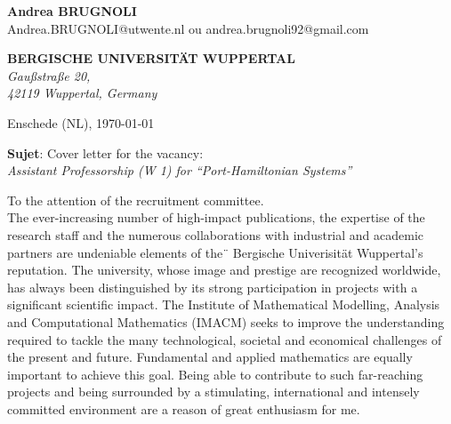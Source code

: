 \documentclass[11pt]{letter}
\begin{document}
	\sffamily
	\begin{flushleft}
		{\bfseries Andrea \textsc{BRUGNOLI}}\\[.35ex]
		Andrea.BRUGNOLI@utwente.nl ou andrea.brugnoli92@gmail.com
	\end{flushleft}
	\begin{flushright}
		{\bfseries BERGISCHE UNIVERSITÄT WUPPERTAL}\\[.35ex]
		\small\itshape
		Gau{\ss}stra{\ss}e 20,  \\
		42119 Wuppertal, Germany
	\end{flushright}
	\begin{flushright}
		Enschede (NL), \today 
	\end{flushright}
	\textbf{Sujet}: Cover letter for the vacancy:\\
	\textit{Assistant Professorship (W 1) for “Port-Hamiltonian Systems”}
	
	
	To the attention of the recruitment committee.\\
	
	The ever-increasing number of high-impact publications, the expertise of the research staff and the numerous collaborations with industrial and academic partners are undeniable elements of the¨ Bergische Univerisit\"{a}t Wuppertal's reputation. The university, whose image and prestige are recognized worldwide, has always been distinguished by its strong participation in projects with a significant scientific impact. The Institute of Mathematical Modelling, Analysis and Computational Mathematics (IMACM) seeks to improve the understanding required to tackle the many technological, societal and economical challenges of the present and future. Fundamental and applied mathematics are equally important to achieve this goal. Being able to contribute to such far-reaching projects and being surrounded by a stimulating, international and intensely committed environment are a reason of great enthusiasm for me.
	
\end{document}
